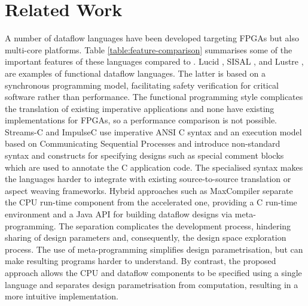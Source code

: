 \section{Related Work}

A number of dataflow languages have been developed targeting FPGAs but
also multi-core platforms. Table \ref{table:feature-comparison}
summarises some of the important features of these languages compared
to \MAXC{}. Lucid \cite{ashcroft1977lucid}, SISAL
\cite{gurd1987implicit}, \cite{mcgraw1983sisal} and Lustre
\cite{halbwachs1991synchronous}, are examples of functional dataflow
languages. The latter is based on a synchronous programming model,
facilitating safety verification for critical software
\cite{halbwachs1992programming} rather than performance. The
functional programming style complicates the translation of existing
imperative applications and none have existing implementations for
FPGAs, so a performance comparison is not possible.
Streams-C\cite{Gokhale:Stone:Arnold:Kalinowski:2000} and
ImpulseC\cite{ImpulseC} use imperative ANSI C syntax and an execution
model based on Communicating Sequential Processes and introduce
non-standard syntax and constructs for specifying designs such as
special comment blocks which are used to annotate the C application
code. The specialised syntax makes the languages harder to integrate
with existing source-to-source translation or aspect weaving
frameworks. Hybrid approaches such as MaxCompiler
\cite{MaxelerTechnologies:2012} separate the CPU run-time component
from the accelerated one, providing a C run-time environment and a
Java API for building dataflow designs via meta-programming. The
separation complicates the development process, hindering sharing of
design parameters and, consequently, the design space exploration
process. The use of meta-programming simplifies design
parametrisation, but can make resulting programs harder to
understand. By contrast, the proposed approach allows the CPU and
dataflow components to be specified using a single language and
separates design parametrisation from computation, resulting in a more
intuitive implementation.

